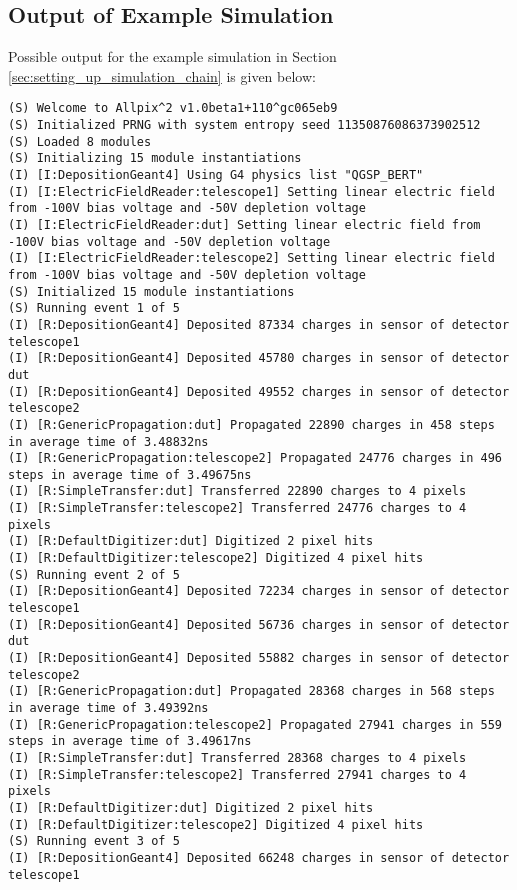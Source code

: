 \subsection{Output of Example Simulation}
\label{sec:example_output}
Possible output for the example simulation in Section \ref{sec:setting_up_simulation_chain} is given below:

\begin{lstlisting}[breaklines]
(S) Welcome to Allpix^2 v1.0beta1+110^gc065eb9
(S) Initialized PRNG with system entropy seed 11350876086373902512
(S) Loaded 8 modules
(S) Initializing 15 module instantiations
(I) [I:DepositionGeant4] Using G4 physics list "QGSP_BERT"
(I) [I:ElectricFieldReader:telescope1] Setting linear electric field from -100V bias voltage and -50V depletion voltage
(I) [I:ElectricFieldReader:dut] Setting linear electric field from -100V bias voltage and -50V depletion voltage
(I) [I:ElectricFieldReader:telescope2] Setting linear electric field from -100V bias voltage and -50V depletion voltage
(S) Initialized 15 module instantiations
(S) Running event 1 of 5
(I) [R:DepositionGeant4] Deposited 87334 charges in sensor of detector telescope1
(I) [R:DepositionGeant4] Deposited 45780 charges in sensor of detector dut
(I) [R:DepositionGeant4] Deposited 49552 charges in sensor of detector telescope2
(I) [R:GenericPropagation:dut] Propagated 22890 charges in 458 steps in average time of 3.48832ns
(I) [R:GenericPropagation:telescope2] Propagated 24776 charges in 496 steps in average time of 3.49675ns
(I) [R:SimpleTransfer:dut] Transferred 22890 charges to 4 pixels
(I) [R:SimpleTransfer:telescope2] Transferred 24776 charges to 4 pixels
(I) [R:DefaultDigitizer:dut] Digitized 2 pixel hits
(I) [R:DefaultDigitizer:telescope2] Digitized 4 pixel hits
(S) Running event 2 of 5
(I) [R:DepositionGeant4] Deposited 72234 charges in sensor of detector telescope1
(I) [R:DepositionGeant4] Deposited 56736 charges in sensor of detector dut
(I) [R:DepositionGeant4] Deposited 55882 charges in sensor of detector telescope2
(I) [R:GenericPropagation:dut] Propagated 28368 charges in 568 steps in average time of 3.49392ns
(I) [R:GenericPropagation:telescope2] Propagated 27941 charges in 559 steps in average time of 3.49617ns
(I) [R:SimpleTransfer:dut] Transferred 28368 charges to 4 pixels
(I) [R:SimpleTransfer:telescope2] Transferred 27941 charges to 4 pixels
(I) [R:DefaultDigitizer:dut] Digitized 2 pixel hits
(I) [R:DefaultDigitizer:telescope2] Digitized 4 pixel hits
(S) Running event 3 of 5
(I) [R:DepositionGeant4] Deposited 66248 charges in sensor of detector telescope1

\end{lstlisting}

